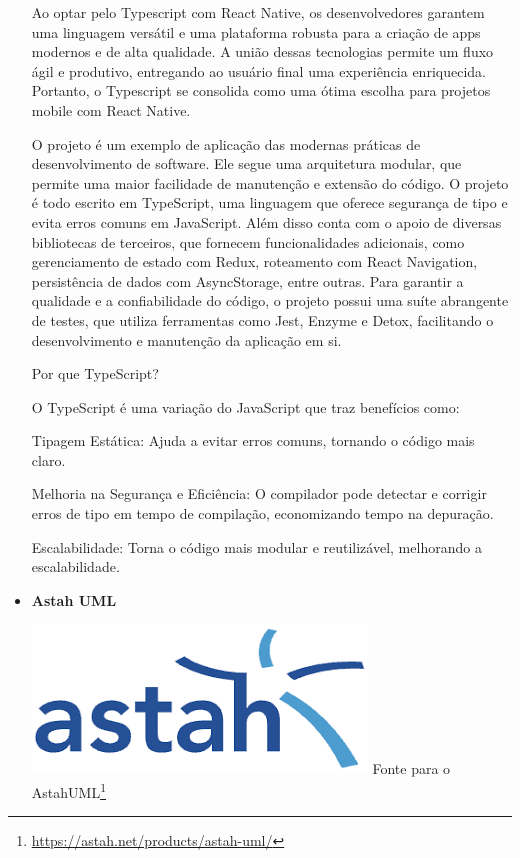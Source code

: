 \begin{itemize}
Ao optar pelo Typescript com React Native, os desenvolvedores garantem uma linguagem versátil e uma plataforma robusta para a criação de apps modernos e de alta qualidade. A união dessas tecnologias permite um fluxo ágil e produtivo, entregando ao usuário final uma experiência enriquecida. Portanto, o Typescript se consolida como uma ótima escolha para projetos mobile com React Native.

O projeto é um exemplo de aplicação das modernas práticas de desenvolvimento de software. Ele segue uma arquitetura modular, que permite uma maior facilidade de manutenção e extensão do código. O projeto é todo escrito em TypeScript, uma linguagem que oferece segurança de tipo e evita erros comuns em JavaScript.
Além disso conta com o apoio de diversas bibliotecas de terceiros, que fornecem funcionalidades adicionais, como gerenciamento de estado com Redux, roteamento com React Navigation, persistência de dados com AsyncStorage, entre outras. Para garantir a qualidade e a confiabilidade do código, o projeto possui uma suíte abrangente de testes, que utiliza ferramentas como Jest, Enzyme e Detox, facilitando o desenvolvimento e manutenção da aplicação em si.

Por que TypeScript?

    O TypeScript é uma variação do JavaScript que traz benefícios como:

    Tipagem Estática: Ajuda a evitar erros comuns, tornando o código mais claro.

    Melhoria na Segurança e Eficiência: O compilador pode detectar e corrigir erros de tipo em tempo de compilação, economizando tempo na depuração.

    Escalabilidade: Torna o código mais modular e reutilizável, melhorando a escalabilidade.

    \item \textbf{Astah UML}
    \begin{center}
    \includegraphics[width=0.5\linewidth]{figuras/Astah UML.png}
    \label{fig:Astah UML}
    Fonte para o AstahUML\footnote{\url{https://astah.net/products/astah-uml/}}
\end{center}


\end{itemize}

